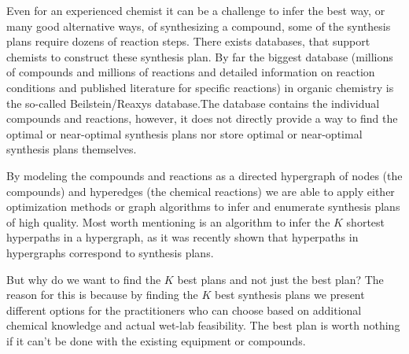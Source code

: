 \documentclass[a4paper,10pt,titlepage]{paper}
\begin{document}
Even for an experienced chemist it can be a challenge to infer the best way, or many good alternative ways, of synthesizing a compound, some of the synthesis plans require dozens of reaction steps. There exists databases, that support chemists to construct these synthesis plan. By far the biggest database (millions of compounds and millions of reactions and detailed information on reaction conditions and published literature for specific reactions) in organic chemistry is the so-called Beilstein/Reaxys database\cite{WikiReaxys}\cite{WikiBeilstein}.The database contains the individual compounds and reactions, however, it does not directly provide a way to find the optimal or near-optimal synthesis plans nor store optimal or near-optimal synthesis plans themselves.

By modeling the compounds and reactions as a directed hypergraph of nodes (the compounds) and hyperedges (the chemical reactions) we are able to apply either optimization methods or graph algorithms to infer and enumerate synthesis plans of high quality. Most worth mentioning is an algorithm to infer the $K$ shortest hyperpaths in a hypergraph, as it was recently shown \cite{Nielsen} that hyperpaths in hypergraphs correspond to synthesis plans.

But why do we want to find the $K$ best plans and not just the best plan? The reason for this is because by finding the $K$ best synthesis plans we present different options for the practitioners who can choose based on additional chemical knowledge and actual wet-lab feasibility. The best plan is worth nothing if it can't be done with the existing equipment or compounds.
\end{document}
